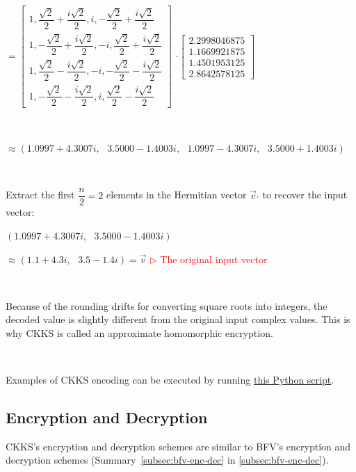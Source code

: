 $= 
\begin{bmatrix}
1,\dfrac{\sqrt{2}}{2} + \dfrac{i\sqrt{2}}{2},i, -\dfrac{\sqrt{2}}{2} + \dfrac{i\sqrt{2}}{2}\\
1,-\dfrac{\sqrt{2}}{2} + \dfrac{i\sqrt{2}}{2}, -i,\dfrac{\sqrt{2}}{2} + \dfrac{i\sqrt{2}}{2}\\
1,\dfrac{\sqrt{2}}{2} - \dfrac{i\sqrt{2}}{2}, -i, -\dfrac{\sqrt{2}}{2} - \dfrac{i\sqrt{2}}{2}\\
1,-\dfrac{\sqrt{2}}{2} - \dfrac{i\sqrt{2}}{2}, i, \dfrac{\sqrt{2}}{2} - \dfrac{i\sqrt{2}}{2}
\end{bmatrix}$
$\cdot \begin{bmatrix}
2.2998046875\\1.1669921875\\1.4501953125\\2.8642578125
\end{bmatrix}$

$ $

$ \approx (1.0997+4.3007i, \text{ } 3.5000-1.4003i, \text{ } 1.0997-4.3007i, \text{ } 3.5000+1.4003i)$

$ $

Extract the first $\dfrac{n}{2} = 2$ elements in the Hermitian vector $\vec{v}_{'}$ to recover the input vector:

$(1.0997+4.3007i, \text{ } 3.5000-1.4003i)$

$\approx (1.1 + 4.3i, \text{ } 3.5 - 1.4i) = \vec{v}$ \textcolor{red}{  $\rhd$ The original input vector}

$ $

Because of the rounding drifts for converting square roots into integers, the decoded value is slightly different from the original input complex values. This is why CKKS is called an approximate homomorphic encryption.

$ $

 Examples of CKKS encoding can be executed by running \href{https://github.com/fhetextbook/fhe-textbook/blob/main/source%20code/ckks.py}{\underline{this Python script}}. 



\subsection{Encryption and Decryption}
\label{subsec:ckks-enc-dec}

CKKS's encryption and decryption schemes are similar to BFV's encryption and decryption schemes (Summary~\ref*{subsec:bfv-enc-dec} in \autoref{subsec:bfv-enc-dec}). 


